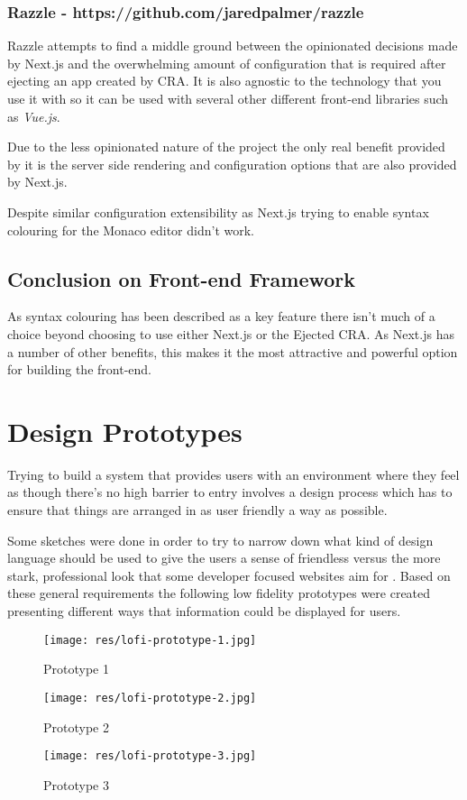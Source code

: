 \subsubsection{Razzle - https://github.com/jaredpalmer/razzle}

Razzle attempts to find a middle ground between the opinionated decisions made by Next.js and the overwhelming amount of configuration that is required after ejecting an app created by CRA. It is also agnostic to the technology that you use it with so it can be used with several other different front-end libraries such as \textit{Vue.js}.

Due to the less opinionated nature of the project the only real benefit provided by it is the server side rendering and configuration options that are also provided by Next.js.

Despite similar configuration extensibility as Next.js trying to enable syntax colouring for the Monaco editor didn't work.

\subsection{Conclusion on Front-end Framework}

As syntax colouring has been described as a key feature there isn't much of a choice beyond choosing to use either Next.js or the Ejected CRA. As Next.js has a number of other benefits, this makes it the most attractive and powerful option for building the front-end.

\section{Design Prototypes} \label{solapp-design}

Trying to build a system that provides users with an environment where they feel as though there's no high barrier to entry involves a design process which has to ensure that things are arranged in as user friendly a way as possible.

Some sketches were done in order to try to narrow down what kind of design language should be used to give the users a sense of friendless versus the more stark, professional look that some developer focused websites aim for \cite{stackoverflow}. Based on these general requirements the following low fidelity prototypes were created presenting different ways that information could be displayed for users.

\begin{figure}[!htb]
  \texttt{[image: res/lofi-prototype-1.jpg]}
  \caption{Prototype 1}\label{fig:lofi-prototype-1}
  \endminipage\hfill
  \texttt{[image: res/lofi-prototype-2.jpg]}
  \caption{Prototype 2}\label{fig:lofi-prototype-2}
  \endminipage\hfill
  \texttt{[image: res/lofi-prototype-3.jpg]}
  \caption{Prototype 3}\label{fig:lofi-prototype-3}
  \endminipage
\end{figure}

